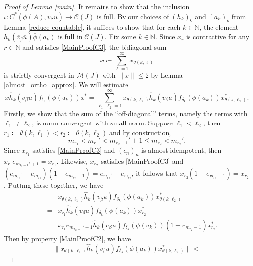\documentclass[reqno]{amsart}
\theoremstyle{definition}
\theoremstyle{remark}
\numberwithin{equation}{section}
\theoremstyle{definition}
\newcommand{\calC}{\mathcal{C}}
\begin{document}
\begin{proof}[Proof of Lemma \ref{main}]
It remains to show that the inclusion $\iota: C^{*}(\overline{\phi}(A), \overline{v}_{\beta}\overline{u})\rightarrow \calC(J)$ is full. By our choices of $(h_{k})_{k}$ and $(a_{k})_{k}$ from Lemma \ref{reduce-countable}, it suffices to show that for each $k\in \mathbb{N}$, the element $h_{k}(\overline{v}_{\beta} \overline{u}) \overline{\phi}(a_{k})$ is full in $\calC(J)$. Fix some $k\in \mathbb{N}$. Since $x_{r}$ is contractive for any $r\in\mathbb{N}$ and satisfies \eqref{MainProofC3}, the bidiagonal sum
\begin{equation} 
x \coloneqq \sum_{\ell=1}^{\infty} x_{\theta(k, \ell)} 
\end{equation} 
is strictly convergent in $\mathcal M(J)$ with $\|x\|\leq 2$ by Lemma \ref{almost_ortho_approx}. We will estimate 
\begin{equation} \label{big_sum} 
x\hat{h}_{k}(v_\beta u)f_{\delta_k}(\phi(a_k))x^*=\sum_{\ell_1,\ell_2=1}^\infty x_{\theta(k, \ell_{1})}\hat{h}_{k}(v_\beta u)f_{\delta_{k}} (\phi(a_{k}))x_{\theta(k, \ell_{2})}^*. 
\end{equation} 
Firstly, we show that the sum of the ``off-diagonal'' terms, namely the terms with $\ell_{1}\neq \ell_{2}$, is norm convergent with small norm. Suppose $\ell_{1}<\ell_{2}$, then $r_{1} \coloneqq \theta(k, \ell_{1}) < r_{2} \coloneqq\theta(k, \ell_{2})$ and by construction, 
\begin{equation} 
m_{r_{1}} < m_{r_{1}}' < m_{r_{2}-1}'+1 \leq m_{r_{2}} < m_{r_{2}}'. 
\end{equation} 
Since $x_{r_{1}}$ satisfies \eqref{MainProofC3} and $(e_{n})_{n}$ is almost idempotent, then $x_{r_{1}} e_{m_{r_{2}-1}'+1} = x_{r_{1}}$. Likewise, $x_{r_{2}}$ satisfies \eqref{MainProofC3} and $(e_{m_{r_{2}}'}-e_{m_{r_{2}}})(1-e_{m_{r_{2}}-1}) = e_{m_{r_{2}}'}-e_{m_{r_{2}}}$, it follows that $x_{r_{2}}(1-e_{m_{r_{2}}-1}) = x_{r_{2}}$. Putting these together, we have 
\begin{align} 
&&{}& x_{\theta(k, \ell_{1})}\hat{h}_k(v_\beta u)f_{\delta_k}(\phi(a_{k}))x_{\theta(k, \ell_{2})}^{*} \\
&&={}& x_{r_{1}}\hat{h}_k(v_\beta u)f_{\delta_k}(\phi(a_k))x_{r_{2}}^*\\ 
&&={}&
x_{r_{1}}e_{m_{r_{2}-1}'+1}\hat{h}_k(v_\beta u)f_{\delta_k}(\phi(a_k))(1-e_{m_{r_{2}}-1})x_{r_{2}}^*.
\end{align} 
Then by property \eqref{MainProofC2}, we have 
\begin{equation} 
\big\|x_{\theta(k, \ell_{1})}\hat{h}_k(v_\beta u)f_{\delta_k}(\phi(a_{k}))x_{\theta(k, \ell_{2})}^{*}\big\| < 

\end{equation}
\end{proof}
\end{document}
